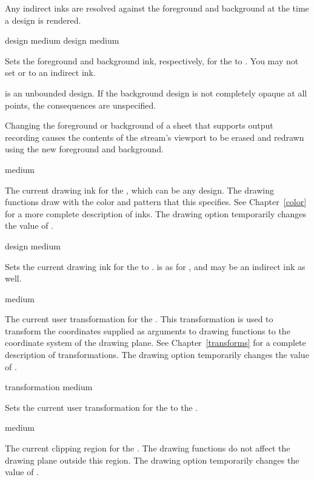 Any indirect inks are resolved against the foreground and background at the time
a design is rendered.

 {design medium}
 {design medium}

Sets the foreground and background ink, respectively, for the 
 to .  You may not set  or
 to an indirect ink.  

 is an unbounded design.  If the background design is not completely
opaque at all points, the consequences are unspecified.

Changing the foreground or background of a sheet that supports output recording
causes the contents of the stream's viewport to be erased and redrawn using the
new foreground and background.


 {medium}

The current drawing ink for the  , which can be any
design.  The drawing functions draw with the color and pattern that this
specifies.  See Chapter~\ref{color} for a more complete description of inks.
The  drawing option temporarily changes the value of .

 {design medium}

Sets the current drawing ink for the   to .
 is as for , and may be an indirect ink as
well.


 {medium}

The current user transformation for the  .  This
transformation is used to transform the coordinates supplied as arguments to
drawing functions to the coordinate system of the drawing plane.  See
Chapter~\ref{transforms} for a complete description of transformations.  The
 drawing option temporarily changes the value of
.

 {transformation medium}

Sets the current user transformation for the   to the
 .


 {medium}

The current clipping region for the  .  The drawing
functions do not affect the drawing plane outside this region.  The
 drawing option temporarily changes the value of
.


